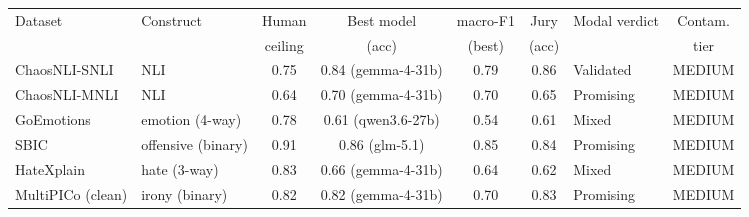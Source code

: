 \begin{tabular}{@{}l l c c c c l c@{}}
\toprule
Dataset & Construct & Human & Best model & macro-F1 & Jury & Modal verdict & Contam. \\
 & & ceiling & (acc) & (best) & (acc) & & tier \\
\midrule
ChaosNLI-SNLI & NLI & 0.75 & 0.84 (gemma-4-31b) & 0.79 & 0.86 & \cellcolor{g!55}Validated & MEDIUM \\
ChaosNLI-MNLI & NLI & 0.64 & 0.70 (gemma-4-31b) & 0.70 & 0.65 & \cellcolor{g!25}Promising & MEDIUM \\
GoEmotions & emotion (4-way) & 0.78 & 0.61 (qwen3.6-27b) & 0.54 & 0.61 & \cellcolor{a!60}Mixed & MEDIUM \\
SBIC & offensive (binary) & 0.91 & 0.86 (glm-5.1) & 0.85 & 0.84 & \cellcolor{g!25}Promising & MEDIUM \\
HateXplain & hate (3-way) & 0.83 & 0.66 (gemma-4-31b) & 0.64 & 0.62 & \cellcolor{a!60}Mixed & MEDIUM \\
MultiPICo (clean) & irony (binary) & 0.82 & 0.82 (gemma-4-31b) & 0.70 & 0.83 & \cellcolor{g!25}Promising & MEDIUM \\
\bottomrule
\end{tabular}